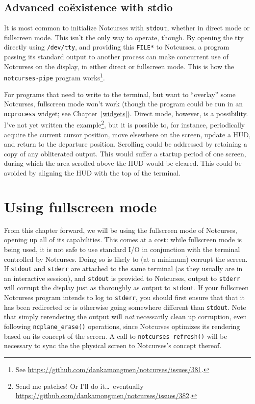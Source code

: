 \documentclass[letterpaper,10pt]{article}
\begin{document}
\subsection{Advanced coëxistence with stdio}
It is most common to initialize Notcurses with \texttt{stdout}, whether in
direct mode or fullscreen mode. This isn't the only way to operate, though.
By opening the tty directly using \texttt{/dev/tty}\cite{tty4}, and providing
this \texttt{FILE*} to Notcurses, a program passing its standard output to
another process can make concurrent use of Notcurses on the display, in either
direct or fullscreen mode. This is how the \texttt{notcurses-pipe} program
works\footnote{See \url{https://github.com/dankamongmen/notcurses/issues/381}.}.

For programs that need to write to the terminal, but want to ``overlay'' some
Notcurses, fullscreen mode won't work (though the program could be run in an
\texttt{ncprocess} widget; see Chapter~\ref{widgets}). Direct mode, however, is
a possibility. I've not yet written the example\footnote{Send me patches! Or
I'll do it\ldots\ eventually \url{https://github.com/dankamongmen/notcurses/issues/382}.}, but it is possible to, for
instance, periodically acquire the current cursor position, move elsewhere on
the screen, update a HUD, and return to the departure position. Scrolling could
be addressed by retaining a copy of any obliterated output. This would suffer
a startup period of one screen, during which the area scrolled above the HUD
would be cleared. This could be avoided by aligning the HUD with the top of
the terminal.

\newpage

\section{Using fullscreen mode}
From this chapter forward, we will be using the fullscreen mode of Notcurses,
opening up all of its capabilities. This comes at a cost: while fullscreen mode
is being used, it is not safe to use standard I/O in conjunction with the
terminal controlled by Notcurses. Doing so is likely to (at a minimum) corrupt
the screen. If \texttt{stdout} and \texttt{stderr} are attached to the same
terminal (as they usually are in an interactive session), and \texttt{stdout}
is provided to Notcurses, output to \texttt{stderr} will corrupt the display
just as thoroughly as output to \texttt{stdout}. If your fullscreen Notcurses
program intends to log to \texttt{stderr}, you should first ensure that that
it has been redirected or is otherwise going somewhere different than
\texttt{stdout}. Note that simply rerendering the output will \textit{not}
necessarily clean up corruption, even following \texttt{ncplane\_erase()}
operations, since Notcurses optimizes its rendering based on its concept of the
screen. A call to \texttt{notcurses\_refresh()} will be necessary to sync the
the physical screen to Notcurses's concept thereof.
\end{document}
